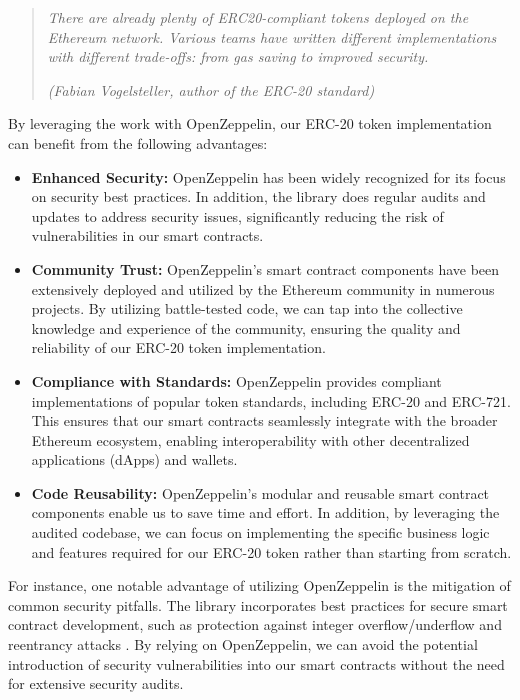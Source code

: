\newpage

\begin{quote}
   \textit{There are already plenty of ERC20-compliant tokens deployed on the Ethereum network. Various teams have written different implementations with different trade-offs: from gas saving to improved security.}


   \textit{(Fabian Vogelsteller, author of the ERC-20 standard)}
\end{quote}


By leveraging the work with OpenZeppelin, our ERC-20 token implementation can benefit from the following advantages:
\begin{itemize}
\item \textbf{Enhanced Security:} OpenZeppelin has been widely recognized for its focus on security best practices. In addition, the library does regular audits and updates to address security issues, significantly reducing the risk of vulnerabilities in our smart contracts.
\item \textbf{Community Trust:} OpenZeppelin's smart contract components have been extensively deployed and utilized by the Ethereum community in numerous projects. By utilizing battle-tested code, we can tap into the collective knowledge and experience of the community, ensuring the quality and reliability of our ERC-20 token implementation.
\item \textbf{Compliance with Standards:} OpenZeppelin provides compliant implementations of popular token standards, including ERC-20 and ERC-721. This ensures that our smart contracts seamlessly integrate with the broader Ethereum ecosystem, enabling interoperability with other decentralized applications (dApps) and wallets.
\item \textbf{Code Reusability:} OpenZeppelin's modular and reusable smart contract components enable us to save time and effort. In addition, by leveraging the audited codebase, we can focus on implementing the specific business logic and features required for our ERC-20 token rather than starting from scratch.
\end{itemize}
For instance, one notable advantage of utilizing OpenZeppelin is the mitigation of common security pitfalls. The library incorporates best practices for secure smart contract development, 
such as protection against integer overflow/underflow and reentrancy attacks \cite{solidity_reeantrency_attack}. By relying on OpenZeppelin, we can avoid the potential introduction of 
security vulnerabilities into our smart contracts without the need for extensive security audits.

